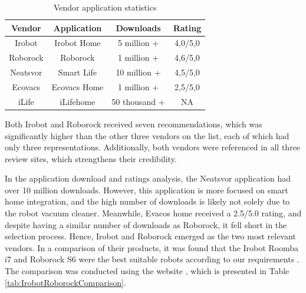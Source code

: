 \begin{table}[H]
\centering
\caption{Vendor application statistics}
\label{tab:VendorApplicationStat}
\begin{tabular}{|c|c|c|c|}
\hline
\textbf{Vendor} & \textbf{Application} & \textbf{Downloads} & \textbf{Rating} \\ \hline
Irobot          & Irobot Home          & 5 million +        & 4,0/5,0         \\ \hline
Roborock        & Roborock             & 1 million +        & 4,6/5,0         \\ \hline
Neatsvor        & Smart Life           & 10 million +       & 4,5/5,0         \\ \hline
Ecovacs         & Ecovacs Home         & 1 million +        & 2,5/5,0         \\ \hline
iLife           & iLifehome            & 50 thousand +      & NA              \\ \hline
\end{tabular}
\end{table}
Both Irobot and Roborock received seven recommendations, which was significantly higher than the other three vendors on the list, each of which had only three representations. Additionally, both vendors were referenced in all three review sites, which strengthens their credibility. 

In the application download and ratings analysis, the Neatsvor application had over 10 million downloads. However, this application is more focused on smart home integration, and the high number of downloads is likely not solely due to the robot vacuum cleaner. Meanwhile, Evacos home received a 2.5/5.0 rating, and despite having a similar number of downloads as Roborock, it fell short in the selection process. Hence, Irobot and Roborock emerged as the two most relevant vendors. In a comparison of their products, it was found that the Irobot Roomba i7 and Roborock S6 were the best suitable robots according to our requirements \cite{robotsel8} \cite{robotsel6}. The comparison was conducted using the website \cite{robotsel9}, which is presented in Table \ref{tab:IrobotRoborockComparison}.

